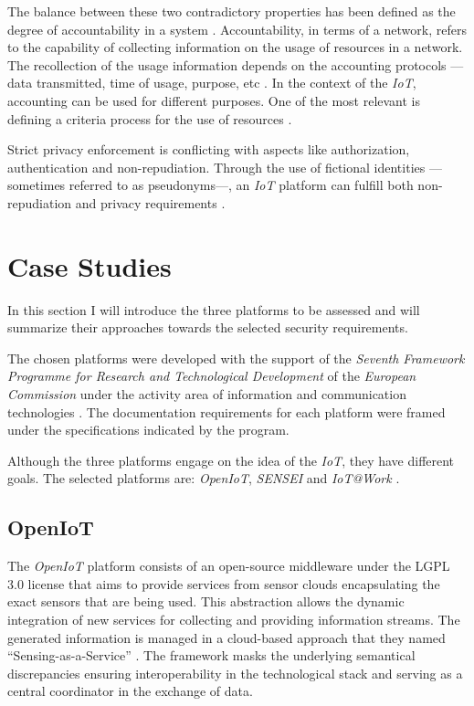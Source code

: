 \documentclass[journal]{IEEEtran}
\begin{document}
  The balance between these two contradictory properties has been defined as the degree of accountability in a system \cite{Bassi2013}. Accountability, in terms of a network, refers to the capability of collecting information on the usage of resources in a network. The recollection of the usage information depends on the accounting protocols ---data transmitted, time of usage, purpose, etc  \cite{Sklavos2007}. In the context of the \emph{IoT}, accounting can be used for different purposes. One of the most relevant is defining a criteria process for the use of resources \cite{Bauge2010}.

  Strict privacy enforcement is conflicting with aspects like authorization, authentication and non-repudiation. Through the use of fictional identities ---sometimes referred to as pseudonyms---, an \emph{IoT} platform can fulfill both non-repudiation and privacy requirements \cite{Baldini2012}. 
  
\section{Case Studies}
  In this section I will introduce the three platforms to be assessed and will summarize their approaches towards the selected security requirements.

  The chosen platforms were developed with the support of the \emph{Seventh Framework Programme for Research and Technological Development} of the \emph{European Commission} under the activity area of information and communication technologies \cite{FP7}\cite{FP7-ICT}\cite{ICT}. The documentation requirements for each platform were framed under the specifications indicated by the program.

  Although the three platforms engage on the idea of the \emph{IoT}, they have different goals. The selected platforms are: \emph{OpenIoT}, \emph{SENSEI}  and \emph{IoT@Work} \cite{OpenIoT} \cite{SENSEI} \cite{IoTWork}.

  \subsection{OpenIoT}

  The \emph{OpenIoT} platform \cite{OpenIoTWeb} consists of an open-source middleware under the LGPL 3.0 license that aims to provide services from sensor clouds encapsulating the exact sensors that are being used. This abstraction allows the dynamic integration of new services for collecting and providing information streams. The generated information is managed in a cloud-based approach that they named ``Sensing-as-a-Service'' \cite{Baldini2012}.  The framework masks the underlying semantical discrepancies ensuring interoperability in the technological stack and serving as a central coordinator in the exchange of data.
\end{document}
